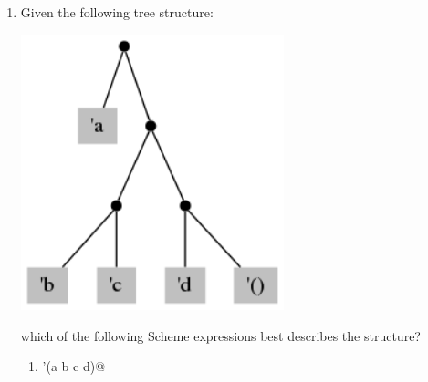 \documentclass[12pt]{article}
\begin{document}
\begin{enumerate}
\begin{verbatim}

      (cdddr '(a b c d e))

\end{verbatim}

\begin{enumerate}

  \item \verb@'b@.

  \item \verb@'c@.
    
  \item \verb@'d@.

  \item \verb@'(c d e)@

  \item \verb@'(d e)@
    
\end{enumerate}
    
\textbf{Answer}: (e).

\verb@cdr@ is \verb@'(b c d e)@; \verb@cddr@ is \verb@'(c d e)@; hence
\verb@cdddr@ is \verb@'(d e)@.


\item Given the following tree structure:

  \begin{center}
    \includegraphics[height=80mm]{nest1}\\
  \end{center}

  which of the following Scheme expressions best describes the
  structure?

\begin{enumerate}

\item \verb@'(a b c d)@


\end{enumerate}
\end{enumerate}
\end{document}

